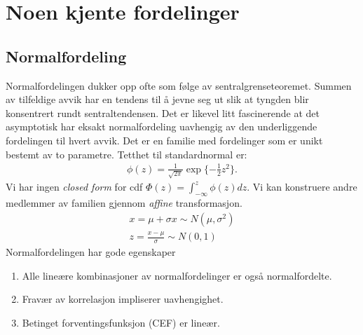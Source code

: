 \chapter{Noen kjente fordelinger}
\section{Normalfordeling}
Normalfordelingen dukker opp ofte som følge av sentralgrenseteoremet. Summen av tilfeldige avvik har en tendens til å jevne seg ut slik at tyngden blir konsentrert rundt sentraltendensen. Det er likevel litt fascinerende at det asymptotisk har eksakt normalfordeling uavhengig av den underliggende fordelingen til hvert avvik. Det er en familie med fordelinger som er unikt bestemt av to parametre. Tetthet til standardnormal er:
\begin{align}
\phi(z)=\frac{1}{\sqrt{2\pi}}\exp\{-\frac{1}{2}z^2\}.
\end{align}
Vi har ingen \textit{closed form} for cdf $\Phi(z) = \int_{-\infty}^z\phi(z)dz$. Vi kan konstruere andre medlemmer av familien gjennom \textit{affine} transformasjon.
\begin{align}
x = \mu + \sigma x \sim N(\mu, \sigma^2) \\
z = \frac{x-\mu}{\sigma} \sim N(0,1)
\end{align}
Normalfordelingen har gode egenskaper
\begin{enumerate}
\item Alle lineære kombinasjoner av normalfordelinger er også normalfordelte.
\item Fravær av korrelasjon impliserer uavhengighet. 
\item Betinget forventingsfunksjon (CEF) er lineær.
\end{enumerate}
